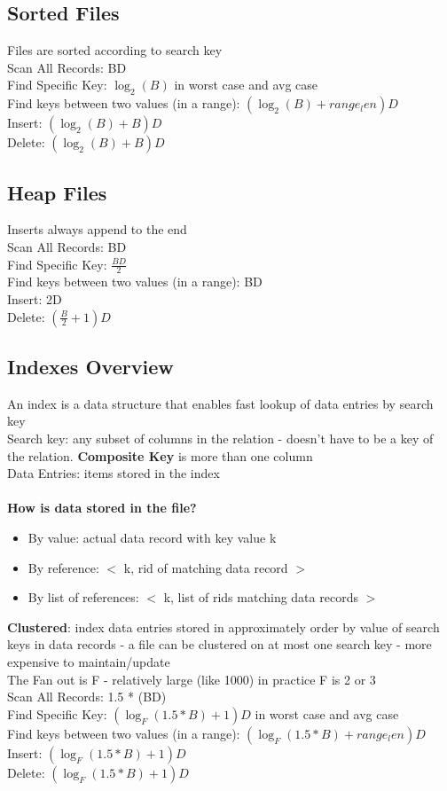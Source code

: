 \documentclass{article}
\begin{document}
\subsection{Sorted Files}
Files are sorted according to search key \\
Scan All Records: BD \\
Find Specific Key: $\log_2(B)$ in worst case and avg case \\
Find keys between two values (in a range): $(\log_2(B) + range_len)D$ \\
Insert: $(\log_2(B) + B)D$\\
Delete: $(\log_2(B) + B)D$
\subsection{Heap Files}
Inserts always append to the end \\ 
Scan All Records: BD \\
Find Specific Key: $\frac{BD}{2}$ \\
Find keys between two values (in a range): BD\\
Insert: 2D \\
Delete: $(\frac{B}{2} + 1)D$
\subsection{Indexes Overview}
An index is a data structure that enables fast lookup of data entries by search key \\ 
Search key: any subset of columns in the relation - doesn't have to be a key of the relation. \textbf{Composite Key} is more than one column \\
Data Entries: items stored in the index \\ \\
\textbf{How is data stored in the file?}
\begin{itemize}
\item By value: actual data record with key value k
\item By reference: $<$ k, rid of matching data record $>$
\item By list of references: $<$ k, list of rids matching data records $>$
\end{itemize}
\textbf{Clustered}: index data entries stored in approximately order by value of search keys in data records - a file can be clustered on at most one search key - more expensive to maintain/update \\
The Fan out is F - relatively large (like 1000) in practice F is 2 or 3 \\
Scan All Records: 1.5 * (BD) \\
Find Specific Key: $(\log_F(1.5 * B) + 1)D$ in worst case and avg case \\
Find keys between two values (in a range): $(\log_F(1.5 * B) + range_len)D$ \\
Insert: $(\log_F(1.5 * B) + 1)D$\\
Delete: $(\log_F(1.5 * B) + 1)D$
\end{document}
